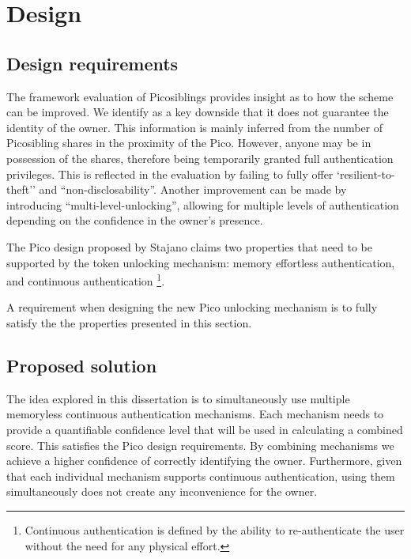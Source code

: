 
\chapter{Design} %

\label{Chapter4} %


\section{Design requirements}
The framework evaluation of Picosiblings provides insight as to how the scheme can be improved. We identify as a key downside that it does not guarantee the identity of the owner. This information is mainly inferred from the number of Picosibling shares in the proximity of the Pico. However, anyone may be in possession of the shares, therefore being temporarily granted full authentication privileges. This is reflected in the evaluation by failing to fully offer `resilient-to-theft'' and ``non-disclosability''. Another improvement can be made by introducing ``multi-level-unlocking'', allowing for multiple levels of authentication depending on the confidence in the owner's presence.

The Pico design proposed by Stajano \cite{stajano2011pico} claims two properties that need to be supported by the token unlocking mechanism: memory effortless authentication, and continuous authentication \footnote{Continuous authentication is defined by the ability to re-authenticate the user without the need for any physical effort.}. 

A requirement when designing the new Pico unlocking mechanism is to fully satisfy the the properties presented in this section.

\section{Proposed solution}
\label{propopsedsol}
The idea explored in this dissertation is to simultaneously use multiple memoryless continuous authentication mechanisms. Each mechanism needs to provide a quantifiable confidence level that will be used in calculating a combined score. This satisfies the Pico design requirements. By combining mechanisms we achieve a higher confidence of correctly identifying the owner. Furthermore, given that each individual mechanism supports continuous authentication, using them simultaneously does not create any inconvenience for the owner.

